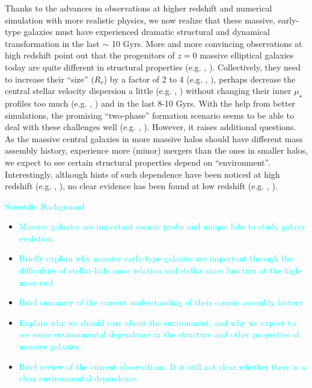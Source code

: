 \documentclass{emulateapj}
\def\mden{{$\mu_{\star}$}}
\newcommand{\plan}[1]{\textcolor{cyan}{#1}}
\begin{document}
\begin{CJK*}{UTF8}{gbsn}
    Thanks to the advances in observations at higher redshift and numerical simulation 
    with more realistic physics, we now realize that these massive, early-type galaxies 
    must have experienced dramatic structural and dynamical transformation in the last 
    $\sim$ 10 Gyrs.
    More and more convincing observations at high redshift point out that the 
    progenitors of $z=0$ massive elliptical galaxies today are quite different 
    in structural properties (e.g. \citealt{Bezanson2009}, \citealt{vanDokkum2010}).  
    Collectively, they need to increase their ``size'' ($R_{\mathrm{e}}$) by a factor 
    of 2 to 4 (e.g. \citealt{Newman2012}, \citealt{vdWel2014}), perhaps decrease the 
    central stellar velocity dispersion a little (e.g. \citealt{vandeSande2011}, 
    \citealt{Belli2014}) without changing their inner \mden{} profiles too much 
    (e.g. \citealt{Szomoru2012}, \citealt{Patel2013}) and  in the last 8-10 Gyrs.  
    With the help from better simulations, the promising ``two-phase'' formation 
    scenario seems to be able to deal with these challenges well (e.g. 
    \citealt{Oser2010}, \citealt{Oser2012}).
    However, it raises additional questions.
    As the massive central galaxies in more massive halos should have different mass 
    assembly history, experience more (minor) mergers than the ones in smaller halos, 
    we expect to see certain structural properties depend on ``environment''. 
    Interestingly, although hints of such dependence have been noticed at high redshift 
    (e.g. \citealt{Papovich2012}, \citealt{Delaye2014}), no clear evidence has been found 
    at low redshift (e.g. \citealt{Nair2010}, \citealt{HCompany13}).     
    
    \plan{Scientific Background}
    \begin{itemize}
        \item \plan{Massive galaxies are important cosmic probe and unique labs to study 
            galaxy evolution.} 
        \item \plan{Briefly explain why massive early-type galaxies are important through 
            the difficulties of stellar-halo mass relation and stellar mass function at 
            the high-mass end.}
        \item \plan{Brief summary of the current understanding of their cosmic assembly 
            history.}
        \item \plan{Explain why we should care about the environment, and why we expect to 
            see some environmental dependence in the structure and other properties of
            massive galaxies.}
        \item \plan{Brief review of the current observations.  It is still not clear 
            whether there is a clear environmental dependence.}
    \end{itemize}


\end{CJK*}
\end{document}

